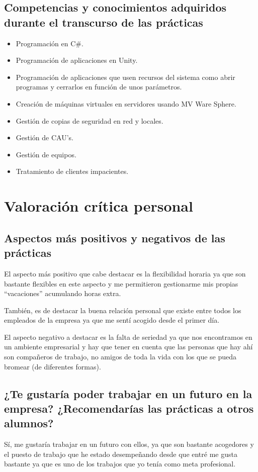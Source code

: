 \documentclass[12pt,letterpaper]{article}
\begin{document}
\subsection{Competencias y conocimientos adquiridos durante el transcurso de las prácticas}
\begin{itemize}
	\item Programación en C\#.
	\item Programación de aplicaciones en Unity.
	\item Programación de aplicaciones que usen recursos del sistema como abrir programas y cerrarlos en función de unos parámetros.
	\item Creación de máquinas virtuales en servidores usando MV Ware Sphere.
	\item Gestión de copias de seguridad en red y locales.
	\item Gestión de CAU's.
	\item Gestión de equipos.
	\item Tratamiento de clientes impacientes.
\end{itemize}

\section{Valoración crítica personal}
\subsection{Aspectos más positivos y negativos de las prácticas}
El aspecto más positivo que cabe destacar es la flexibilidad horaria ya que son bastante flexibles en este aspecto y me permitieron gestionarme mis propias ``vacaciones'' acumulando horas extra.

También, es de destacar la buena relación personal que existe entre todos los empleados de la empresa ya que me sentí acogido desde el primer día.

El aspecto negativo a destacar es la falta de seriedad ya que nos encontramos en un ambiente empresarial y hay que tener en cuenta que las personas que hay ahí son compañeros de trabajo, no amigos de toda la vida con los que se pueda bromear (de diferentes formas).

\subsection{¿Te gustaría poder trabajar en un futuro en la empresa? ¿Recomendarías las prácticas a otros alumnos?}
Sí, me gustaría trabajar en un futuro con ellos, ya que son bastante acogedores y el puesto de trabajo que he estado desempeñando desde que entré me gusta bastante ya que es uno de los trabajos que yo tenía como meta profesional.
\end{document}
